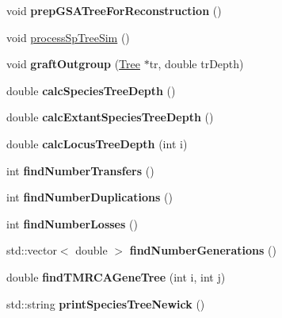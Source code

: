 \begin{DoxyCompactItemize}
void {\bfseries prep\+G\+S\+A\+Tree\+For\+Reconstruction} ()
\item 
void \mbox{\hyperlink{class_simulator_ab88791e8609fa9f8076157516eb9ab1b}{process\+Sp\+Tree\+Sim}} ()
\item 
\mbox{\label{class_simulator_a02924abe5f79ca1c9ac70c49a7947977}} 
void {\bfseries graft\+Outgroup} (\mbox{\hyperlink{class_tree}{Tree}} $\ast$tr, double tr\+Depth)
\item 
\mbox{\label{class_simulator_a3b720bc00028bd2722ec4bea8a18ebe6}} 
double {\bfseries calc\+Species\+Tree\+Depth} ()
\item 
\mbox{\label{class_simulator_a0036d7652cf8a777b12892c842aef1ae}} 
double {\bfseries calc\+Extant\+Species\+Tree\+Depth} ()
\item 
\mbox{\label{class_simulator_ac8a1a45a3a0f2e420a772615654a2ead}} 
double {\bfseries calc\+Locus\+Tree\+Depth} (int i)
\item 
\mbox{\label{class_simulator_a9b86c16407230bbb9cdf476245b5c789}} 
int {\bfseries find\+Number\+Transfers} ()
\item 
\mbox{\label{class_simulator_a56c575c6092df2e6415ac3104ae9e60b}} 
int {\bfseries find\+Number\+Duplications} ()
\item 
\mbox{\label{class_simulator_a1b9baa98cbc1ba7c3055a6314d22b8cd}} 
int {\bfseries find\+Number\+Losses} ()
\item 
\mbox{\label{class_simulator_a2ec0d83a756cbc5c4f2dad456dcdc8d8}} 
std\+::vector$<$ double $>$ {\bfseries find\+Number\+Generations} ()
\item 
\mbox{\label{class_simulator_aa5b343432884746471a99d6508cf7fd5}} 
double {\bfseries find\+T\+M\+R\+C\+A\+Gene\+Tree} (int i, int j)
\item 
\mbox{\label{class_simulator_abf6ee7eae9c75f72ad45be9b731b04b6}} 
std\+::string {\bfseries print\+Species\+Tree\+Newick} ()
\item 
\mbox{\label{class_simulator_ab205a2e713e3c2056844b560b93ce7ba}} 

\end{DoxyCompactItemize}
